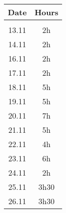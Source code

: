 \vspace{0.5cm}
\begin{tabular}[H]{c|c}
	Date & Hours\\
	\hline\\
	13.11	&	2h\\
	14.11	&	2h\\
	16.11	&	2h\\
	17.11	&	2h\\
	18.11	&	5h\\
	19.11	&	5h\\
	20.11	&	7h\\
	21.11	&	5h\\
	22.11	&	4h\\
	23.11	&	6h\\
	24.11	&	2h\\
	25.11	&	3h30\\
	26.11	&	3h30
\end{tabular}